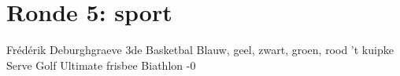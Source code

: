 
\section{Ronde 5: sport}
\begin{questions}

\question[2] Frédérik Deburghgraeve
\vspace{5mm}
\question[2] 3de
\vspace{5mm}
\question[2] Basketbal
\vspace{5mm}
\question[2] Blauw, geel, zwart, groen, rood
\vspace{5mm}
\question[2] 't kuipke
\vspace{5mm}
\question[2] Serve
\vspace{5mm}
\question[2] Golf
\vspace{5mm}
\question[2] Ultimate frisbee
\vspace{5mm}
\question[2] Biathlon
\vspace{5mm}
-0

\end{questions}

\newpage
